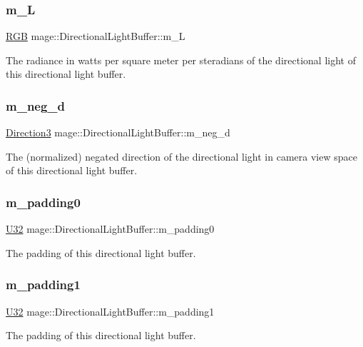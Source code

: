 \subsubsection{\texorpdfstring{m\+\_\+L}{m\_L}}
{\footnotesize\ttfamily \hyperlink{structmage_1_1_r_g_b}{R\+GB} mage\+::\+Directional\+Light\+Buffer\+::m\+\_\+L}

The radiance in watts per square meter per steradians of the directional light of this directional light buffer. \hypertarget{structmage_1_1_directional_light_buffer_af3a1952cf82b66730868573a4b581ab4}{}\label{structmage_1_1_directional_light_buffer_af3a1952cf82b66730868573a4b581ab4} 
\subsubsection{\texorpdfstring{m\+\_\+neg\+\_\+d}{m\_neg\_d}}
{\footnotesize\ttfamily \hyperlink{structmage_1_1_direction3}{Direction3} mage\+::\+Directional\+Light\+Buffer\+::m\+\_\+neg\+\_\+d}

The (normalized) negated direction of the directional light in camera view space of this directional light buffer. \hypertarget{structmage_1_1_directional_light_buffer_aac8d40f7af8eac8b2fb79085843be4fd}{}\label{structmage_1_1_directional_light_buffer_aac8d40f7af8eac8b2fb79085843be4fd} 
\subsubsection{\texorpdfstring{m\+\_\+padding0}{m\_padding0}}
{\footnotesize\ttfamily \hyperlink{namespacemage_a41c104c036fba3756a74e19f793eeaa1}{U32} mage\+::\+Directional\+Light\+Buffer\+::m\+\_\+padding0}

The padding of this directional light buffer. \hypertarget{structmage_1_1_directional_light_buffer_ab94c0c42a54c9751dde8a4a2a84da861}{}\label{structmage_1_1_directional_light_buffer_ab94c0c42a54c9751dde8a4a2a84da861} 
\subsubsection{\texorpdfstring{m\+\_\+padding1}{m\_padding1}}
{\footnotesize\ttfamily \hyperlink{namespacemage_a41c104c036fba3756a74e19f793eeaa1}{U32} mage\+::\+Directional\+Light\+Buffer\+::m\+\_\+padding1}

The padding of this directional light buffer. 